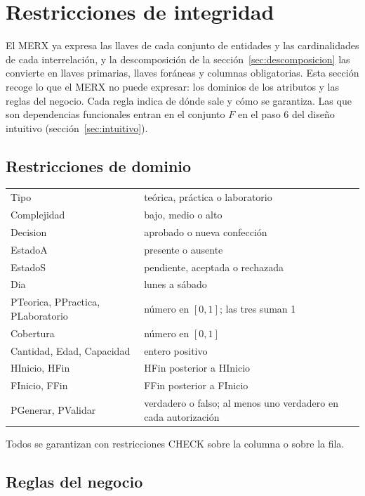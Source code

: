 \section{Restricciones de integridad}\label{sec:restricciones}

El MERX ya expresa las llaves de cada conjunto de entidades y las cardinalidades de cada interrelación, y la descomposición de la sección~\ref{sec:descomposicion} las convierte en llaves primarias, llaves foráneas y columnas obligatorias. Esta sección recoge lo que el MERX no puede expresar: los dominios de los atributos y las reglas del negocio. Cada regla indica de dónde sale y cómo se garantiza. Las que son dependencias funcionales entran en el conjunto $F$ en el paso 6 del diseño intuitivo (sección~\ref{sec:intuitivo}).

\subsection{Restricciones de dominio}

{\small\filas
\begin{xltabular}{\linewidth}{L{0.55}L{1.45}}
 &  \\
\endhead
Tipo & teórica, práctica o laboratorio \\
Complejidad & bajo, medio o alto \\
Decision & aprobado o nueva confección \\
EstadoA & presente o ausente \\
EstadoS & pendiente, aceptada o rechazada \\
Dia & lunes a sábado \\
PTeorica, PPractica, PLaboratorio & número en $[0, 1]$; las tres suman 1 \\
Cobertura & número en $[0, 1]$ \\
Cantidad, Edad, Capacidad & entero positivo \\
HInicio, HFin & HFin posterior a HInicio \\
FInicio, FFin & FFin posterior a FInicio \\
PGenerar, PValidar & verdadero o falso; al menos uno verdadero en cada autorización \\
\end{xltabular}}

Todos se garantizan con restricciones CHECK sobre la columna o sobre la fila.

\subsection{Reglas del negocio}

